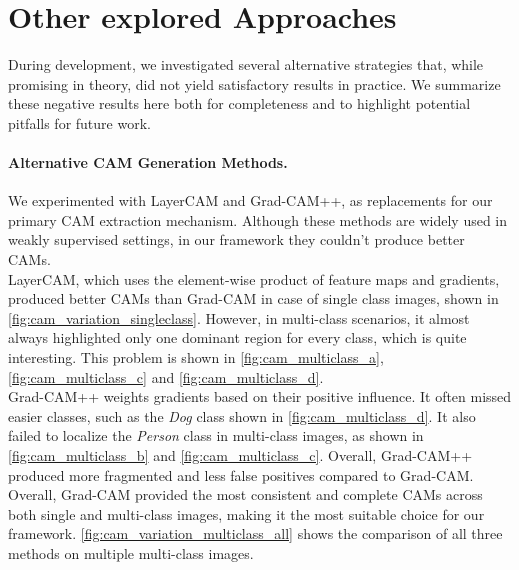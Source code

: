 
\section{Other explored Approaches}
\label{sec:ineffective_approaches}

During development, we investigated several alternative strategies that, while promising in theory, did not yield satisfactory results in practice. We summarize these negative results here both for completeness and to highlight potential pitfalls for future work.  

\paragraph{Alternative CAM Generation Methods.} 
We experimented with LayerCAM and Grad-CAM++, as replacements for our primary CAM extraction mechanism. Although these methods are widely used in weakly supervised settings, in our framework they couldn't produce better CAMs. \\
LayerCAM, which uses the element-wise product of feature maps and gradients, produced better CAMs than Grad-CAM in case of single class images, shown in \autoref{fig:cam_variation_singleclass}. However, in multi-class scenarios, it almost always highlighted only one dominant region for every class, which is quite interesting. This problem is shown in \autoref{fig:cam_multiclass_a}, \autoref{fig:cam_multiclass_c} and \autoref{fig:cam_multiclass_d}. \\
Grad-CAM++ weights gradients based on their positive influence. It often missed easier classes, such as the \textit{Dog} class shown in \autoref{fig:cam_multiclass_d}. It also failed to localize the \textit{Person} class in multi-class images, as shown in \autoref{fig:cam_multiclass_b} and \autoref{fig:cam_multiclass_c}. Overall, Grad-CAM++ produced more fragmented and less false positives compared to Grad-CAM.\\
Overall, Grad-CAM provided the most consistent and complete CAMs across both single and multi-class images, making it the most suitable choice for our framework. \autoref{fig:cam_variation_multiclass_all} shows the comparison of all three methods on multiple multi-class images.

